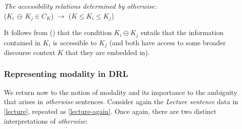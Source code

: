 \pex  \textit{The accessibility relations determined by \emph{otherwise}:}\\
($ K_i\,\ominus\,K_j\in C_K$) $\to$ ($K\leqslant K_i\leqslant K_j$) \xe

It follows from (\lastx) that the condition $ K_i\ominus K_j $ entails that the information contained in $ K_i $ is accessible to $ K_j $ (and both have access to some broader discourse context $ K $ that they are embedded in). 



\subsubsection{Representing modality in DRL}\label{sec:illustration} %

We return now to the notion of modality and its importance to the ambiguity that arises in \textit{otherwise} sentences. Consider again the \textit{Lecture sentence} data in \ref{lecture}, repeated as \ref{lecture-again}. Once again, there are two distinct interpretations of \textit{otherwise}: 

